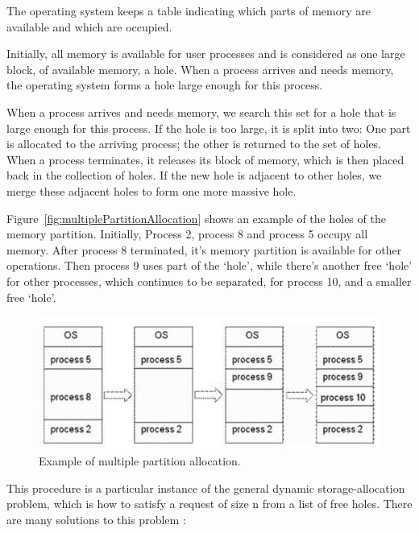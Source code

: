 \documentclass[doc,natbib,12pt]{apa6}
\begin{document}
	The operating system keeps a table indicating which parts of memory are available and which are occupied.
	
	Initially, all memory is available for user processes and is considered as one large block, of available memory, a hole. When a process arrives and needs memory, the operating system forms a hole large enough for this process.
	
	When a process arrives and needs memory, we search this set for a hole that is large enough for this process. If the hole is too large, it is split into two: One part is allocated to the arriving process; the other is returned to the set of holes. When a process terminates, it releases its block of memory, which is then placed back in the collection of holes. If the new hole is adjacent to other holes, we merge these adjacent holes to form one more massive hole.
	
	Figure~\vref{fig:multiplePartitionAllocation} shows an example of the holes of the memory partition. Initially, Process 2, process 8 and process 5 occupy all memory. After process 8 terminated, it's memory partition is available for other operations. Then process 9 uses part of the `hole', while there's another free `hole' for other processes, which continues to be separated, for process 10, and a smaller free `hole'.
	
	\begin{figure}[h]
		\centering
		\includegraphics[width=1\textwidth]{multiplePartitionAllocation.jpg}
		\caption{\label{fig:multiplePartitionAllocation}Example of multiple partition allocation. \citep{Vissicomp2014}}
	\end{figure}
	
	This procedure is a particular instance of the general dynamic storage-allocation problem, which is how to satisfy a request of size n from a list of free holes. There are many solutions to this problem \citep{Petzold2000}:
	
\end{document}
